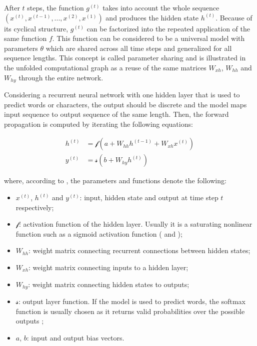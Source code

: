 \documentclass[]{krantz}
\providecommand{\tightlist}{%
  \setlength{\itemsep}{0pt}\setlength{\parskip}{0pt}}
\begin{document}
After \(t\) steps, the function \(g^{(t)}\) takes into account the whole sequence \((x^{(t)},x^{(t-1)},...,x^{(2)}, x^{(1)})\) and produces the hidden state \(h^{(t)}\). Because of its cyclical structure, \(g^{(t)}\) can be factorized into the repeated application of the same function \(f\). This function can be considered to be a universal model with parameters \(\theta\) which are shared across all time steps and generalized for all sequence lengths. This concept is called parameter sharing and is illustrated in the unfolded computational graph as a reuse of the same matrices \(W_{xh}\), \(W_{hh}\) and \(W_{hy}\) through the entire network. \citep{goodfellow2016deep}

Considering a recurrent neural network with one hidden layer that is used to predict words or characters, the output should be discrete and the model maps input sequence to output sequence of the same length. Then, the forward propagation is computed by iterating the following equations:

\begin{align}
h^{(t)} & = \mathcal{f}(a+W_{hh}h^{(t-1)}+W_{xh}x^{(t)}) \label{eq:input-to-hidden} \\
y^{(t)} & = \mathcal{s}(b+W_{hy}h^{(t)}) \label{eq:hidden-to-output}
\end{align}

where, according to \citet{graves2013generating}, the parameters and functions denote the following:

\begin{itemize}
\tightlist
\item
  \(x^{(t)}\), \(h^{(t)}\) and \(y^{(t)}\): input, hidden state and output at time step \(t\) respectively;
\item
  \(\mathcal{f}\): activation function of the hidden layer. Usually it is a saturating nonlinear function such as a sigmoid activation function ( \citet{sutskever2014sequence} and \citet{mikolov2010recurrent});
\item
  \(W_{hh}\): weight matrix connecting recurrent connections between hidden states;
\item
  \(W_{xh}\): weight matrix connecting inputs to a hidden layer;
\item
  \(W_{hy}\): weight matrix connecting hidden states to outputs;
\item
  \(\mathcal{s}\): output layer function. If the model is used to predict words, the softmax function is usually chosen as it returns valid probabilities over the possible outputs \citep{mikolov2010recurrent};
\item
  \(a\), \(b\): input and output bias vectors.
\end{itemize}
\end{document}
